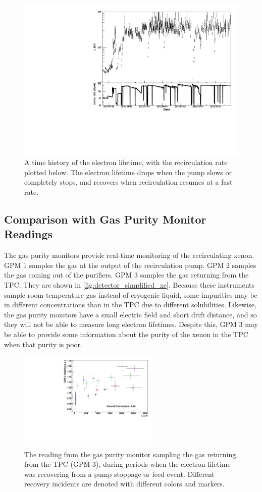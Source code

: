 \documentclass[herrin-thesis.tex]{subfiles}
\begin{document}
\begin{figure}[htbp]
\centering
\includegraphics[width=0.6\columnwidth]{./plots/el_and_recirculation.pdf}
\caption[Time history of electron lifetime and recirculation rate]{A time history of the electron lifetime, with the recirculation rate plotted below. The electron lifetime drops when the pump slows or completely stops, and recovers when recirculation resumes at a fast rate.}
\label{fig:el_and_recirculation}
\end{figure}

\subsection{Comparison with Gas Purity Monitor Readings}
The gas purity monitors \cite{Dobi:2011zr} provide real-time monitoring of the recirculating xenon. GPM 1 samples the gas at the output of the recirculation pump. GPM 2 samples the gas coming out of the purifiers. GPM 3 samples the gas returning from the TPC. They are shown in \cref{fig:detector_simplified_xe}. Because these instruments sample room temperature gas instead of cryogenic liquid, some impurities may be in different concentrations than in the TPC due to different solubilities. Likewise, the gas purity monitors have a small electric field and short drift distance, and so they will not be able to measure long electron lifetimes. Despite this, GPM 3 may be able to provide some information about the purity of the xenon in the TPC when that purity is poor.

\begin{figure}[tbp]
\centering
\includegraphics[width=0.6\textwidth]{./plots/el_gpm_vs_el.pdf}
\caption[GPM 3 reading vs. electron lifetime]{The reading from the gas purity monitor sampling the gas returning from the TPC (GPM 3), during periods when the electron lifetime was recovering from a pump stoppage or feed event. Different recovery incidents are denoted with different colors and markers.}
\label{fig:el_gpm_vs_el}
\end{figure}
\end{document}
